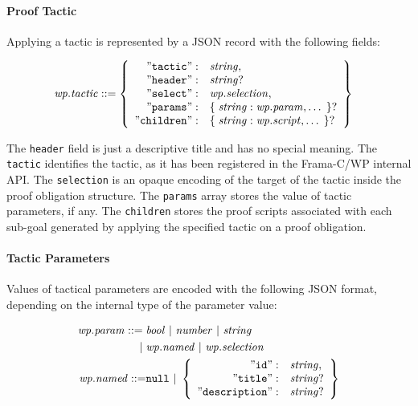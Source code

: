 \paragraph{Proof Tactic} Applying a tactic is represented by a \textsf{JSON} record with the following
fields:

\begin{align*}
    \mathit{wp.tactic} &::=
    \left\{
    \begin{array}{rl}
        \mathtt{"tactic"}   :& \mathit{string}, \\
        \mathtt{"header"}   :& \mathit{string} ? \\ 
        \mathtt{"select"}   :& \mathit{wp.selection}, \\ 
        \mathtt{"params"}   :& \mathtt{\{}\; \mathit{string}:\mathit{wp.param} ,\ldots \;\mathtt{\}} ? \\ 
        \mathtt{"children"} :& \mathtt{\{}\; \mathit{string}:\mathit{wp.script}, \ldots \;\mathtt{\}} ? \\ 
    \end{array}
    \right\}
\end{align*}

The \verb"header" field is just a descriptive title and has no special meaning. The \verb"tactic"
identifies the tactic, as it has been registered in the \textsf{Frama-C/WP} internal API.
The \verb"selection" is an opaque encoding of the target of the tactic inside the proof obligation
structure. The \verb"params" array stores the value of tactic parameters, if any.
The \verb"children" stores the proof scripts associated with each sub-goal generated by applying
the specified tactic on a proof obligation.

\paragraph{Tactic Parameters} Values of tactical parameters are encoded with the
following \textsf{JSON} format, depending on the internal type of the parameter 
value:

\begin{align*}
    \mathit{wp.param} ::=\;&
    \mathit{bool} ~|~ \mathit{number} ~|~ \mathit{string} \\
    |\;&\mathit{wp.named} ~|~ \mathit{wp.selection} \\
    \mathit{wp.named} ::= &\mathtt{null} ~|~
    \left\{
    \begin{array}{rl}
        \mathtt{"id"} :& \mathit{string}, \\
        \mathtt{"title"} :& \mathit{string}? \\
        \mathtt{"description"} :& \mathit{string}?
    \end{array}
    \right\}
\end{align*}

